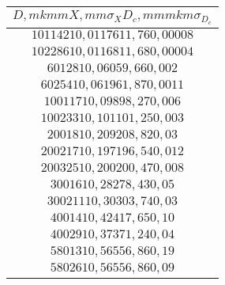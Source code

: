 \begin{tabular}{| c |}
\hline
$D, mkm	m	X, mm	\sigma_X	D_c, mm	mkm	\sigma_D_c$\\
\hline
$10	1	142	1	0,01176	11,76	0,00008$\\
\hline
$10	2	286	1	0,01168	11,68	0,00004$\\
\hline
$60	1	28	1	0,060	59,66	0,002$\\
\hline
$60	2	54	1	0,0619	61,87	0,0011$\\
\hline
$100	1	17	1	0,098	98,27	0,006$\\
\hline
$100	2	33	1	0,101	101,25	0,003$\\
\hline
$200	1	8	1	0,209	208,82	0,03$\\
\hline
$200	2	17	1	0,197	196,54	0,012$\\
\hline
$200	3	25	1	0,200	200,47	0,008$\\
\hline
$300	1	6	1	0,28	278,43	0,05$\\
\hline
$300	2	11	1	0,30	303,74	0,03$\\
\hline
$400	1	4	1	0,42	417,65	0,10$\\
\hline
$400	2	9	1	0,37	371,24	0,04$\\
\hline
$580	1	3	1	0,56	556,86	0,19$\\
\hline
$580	2	6	1	0,56	556,86	0,09$\\
\hline
\end{tabular}
